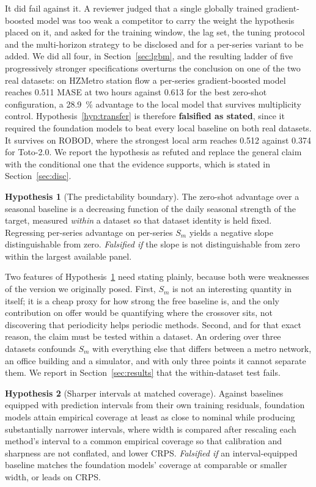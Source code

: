 \documentclass[11pt]{article}
\theoremstyle{plain}
\theoremstyle{definition}
\newtheorem{hypothesis}{Hypothesis}
\theoremstyle{remark}
\newif\ifrevisionmarkup
\newcommand{\new}[1]{\ifrevisionmarkup\textcolor{revision}{#1}\else#1\fi}
\begin{document}
\new{It did fail against it. A reviewer judged that a single globally trained gradient-boosted model was too weak a competitor to carry the weight the hypothesis placed on it, and asked for the training window, the lag set, the tuning protocol and the multi-horizon strategy to be disclosed and for a per-series variant to be added. We did all four, in Section~\ref{sec:lgbm}, and the resulting ladder of five progressively stronger specifications overturns the conclusion on one of the two real datasets: on HZMetro station flow a per-series gradient-boosted model reaches \num{0.511} MASE at two hours against \num{0.613} for the best zero-shot configuration, a \SI{28.9}{\percent} advantage to the local model that survives multiplicity control. Hypothesis~\ref{hyp:transfer} is therefore \textbf{falsified as stated}, since it required the foundation models to beat every local baseline on both real datasets. It survives on ROBOD, where the strongest local arm reaches \num{0.512} against \num{0.374} for Toto-2.0. We report the hypothesis as refuted and replace the general claim with the conditional one that the evidence supports, which is stated in Section~\ref{sec:disc}.}

\begin{hypothesis}[The predictability boundary]
\label{hyp:boundary}
The zero-shot advantage over a seasonal baseline is a decreasing function of the daily seasonal strength of the target, measured \emph{within} a dataset so that dataset identity is held fixed. Regressing per-series advantage on per-series $S_m$ yields a negative slope distinguishable from zero.
\emph{Falsified if} the slope is not distinguishable from zero within the largest available panel.
\end{hypothesis}

Two features of Hypothesis~\ref{hyp:boundary} need stating plainly, because both were weaknesses of the version we originally posed. First, $S_m$ is not an interesting quantity in itself; it is a cheap proxy for how strong the free baseline is, and the only contribution on offer would be quantifying where the crossover sits, not discovering that periodicity helps periodic methods. Second, and for that exact reason, the claim must be tested within a dataset. An ordering over three datasets confounds $S_m$ with everything else that differs between a metro network, an office building and a simulator, and with only three points it cannot separate them. We report in Section~\ref{sec:results} that the within-dataset test fails.

\begin{hypothesis}[Sharper intervals at matched coverage]
\label{hyp:uncertainty}
Against baselines equipped with prediction intervals from their own training residuals, foundation models attain empirical coverage at least as close to nominal while producing substantially narrower intervals\new{, where width is compared after rescaling each method's interval to a common empirical coverage so that calibration and sharpness are not conflated}, and lower CRPS.
\emph{Falsified if} an interval-equipped baseline matches the foundation models' coverage at comparable or smaller width, or leads on CRPS.
\end{hypothesis}
\end{document}

